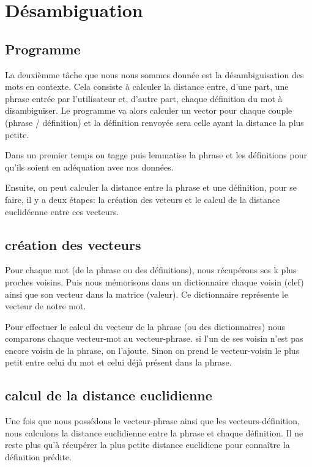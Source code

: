 \section{Désambiguation}
\subsection{Programme}

La deuxièmme tâche que nous nous sommes donnée est la désambiguisation des mots
en contexte. Cela consiste à calculer la distance entre, d'une 
part, une phrase entrée par l'utilisateur et, d'autre part, chaque définition 
du mot à disambiguïser. Le programme va alors calculer un vector pour chaque 
couple (phrase / définition) et la définition renvoyée sera celle ayant la 
distance la plus petite.

Dans un premier temps on tagge puis lemmatise la phrase et les définitions pour 
qu'ils soient en adéquation avec nos données.

Ensuite, on peut calculer la distance entre la phrase et une définition, pour 
se faire, il y a deux étapes: la création des veteurs et le calcul de la 
distance euclidéenne entre ces vecteurs.


\subsection{création des vecteurs}

Pour chaque mot (de la phrase ou des définitions), nous récupérons ses k plus 
proches voisins. Puis nous mémorisons dans un dictionnaire chaque voisin (clef) 
ainsi que son vecteur dans la matrice (valeur). Ce dictionnaire représente le 
vecteur de notre mot.

Pour effectuer le calcul du vecteur de la phrase (ou des dictionnaires) nous 
comparons chaque vecteur-mot au vecteur-phrase. si l'un de ses voisin n'est pas 
encore voisin de la phrase, on l'ajoute. Sinon on prend le vecteur-voisin le 
plus petit entre celui du mot et celui déjà présent dans la phrase.


\subsection{calcul de la distance euclidienne}

Une fois que nous possédons le vecteur-phrase ainsi que les 
vecteurs-définition, nous calculons la distance euclidienne entre la phrase et 
chaque définition. Il ne reste plus qu'à récupérer la plus petite distance 
euclidiene pour connaître la définition prédite.


